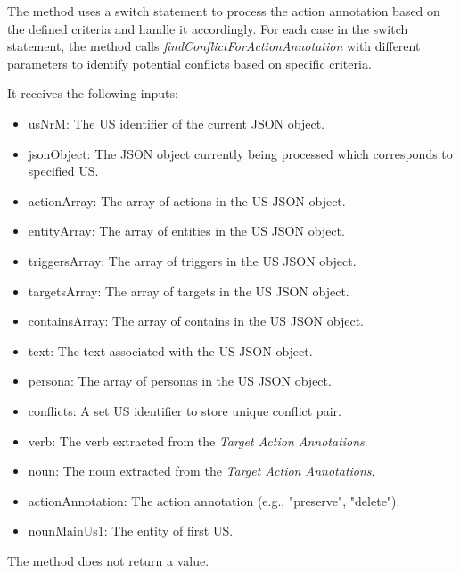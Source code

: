 \begin{itemize}
	The method uses a switch statement to process the action annotation based on the defined criteria and handle it accordingly. For each case in the switch statement, the method calls \textit{findConflictForActionAnnotation} with different parameters to identify potential conflicts based on specific criteria.
	
	It receives the following inputs:
	\begin{itemize}
		\item usNrM: The US identifier of the current JSON object.
		
		\item jsonObject: The JSON object currently being processed which corresponds to specified US.
		
		\item actionArray: The array of actions in the US JSON object.
		
		\item entityArray: The array of entities in the US JSON object.
		
		\item triggersArray: The array of triggers in the US JSON object.
		
		\item targetsArray: The array of targets in the US JSON object.
		
		\item containsArray: The array of contains in the US JSON object.
		
		\item text: The text associated with the US JSON object.
		
		\item persona: The array of personas in the US JSON object.
		
		\item conflicts: A set US identifier to store unique conflict pair.
		
		\item verb: The verb extracted from the \textit{Target Action Annotations}.
		
		\item noun: The noun extracted from the \textit{Target Action Annotations}.
		
		\item actionAnnotation: The action annotation (e.g., "preserve", "delete").
		
		\item nounMainUs1: The entity of first US.
	\end{itemize}
	The method does not return a value.
	

\end{itemize}
